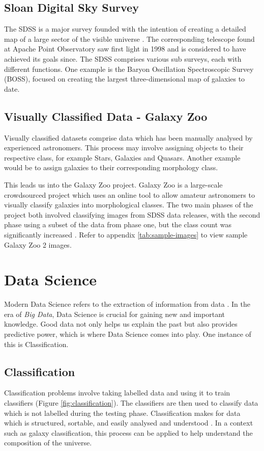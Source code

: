 \subsection{Sloan Digital Sky Survey}
The SDSS is a major survey founded with the intention of creating a detailed map of a large sector of the visible universe \citep{blanton_sloan_2017}.
The corresponding telescope found at Apache Point Observatory saw first light in 1998 and is considered to have achieved its goals since.
The SDSS comprises various sub surveys, each with different functions.
One example is the Baryon Oscillation Spectroscopic Survey (BOSS), focused on creating the largest three-dimensional map of galaxies to date.

\subsection{Visually Classified Data - Galaxy Zoo}
Visually classified datasets comprise data which has been manually analysed by experienced astronomers.
This process may involve assigning objects to their respective class, for example Stars, Galaxies and Quasars.
Another example would be to assign galaxies to their corresponding morphology class.

This leads us into the Galaxy Zoo project.
Galaxy Zoo is a large-scale crowdsourced project which uses an online tool to allow amateur astronomers to visually classify galaxies into morphological classes.
The two main phases of the project both involved classifying images from SDSS data releases,
with the second phase using a subset of the data from phase one, but the class count was significantly increased \citep{willett_galaxy_2013}\citep{lintott_galaxy_2008}.
Refer to appendix \ref{tab:sample-images} to view sample Galaxy Zoo 2 images.

\section{Data Science}

Modern Data Science refers to the extraction of information from data \citep{dhar_data_nodate}.
In the era of \textit{Big Data}, Data Science is crucial for gaining new and important knowledge.
Good data not only helps us explain the past but also provides predictive power, which is where Data Science comes into play.
One instance of this is Classification.

\subsection{Classification}
Classification problems involve taking labelled data and using it to train classifiers (Figure \ref{fig:classification}).
The classifiers are then used to classify data which is not labelled during the testing phase.
Classification makes for data which is structured, sortable, and easily analysed and understood \cite{suthaharan_machine_2015}.
In a context such as galaxy classification, this process can be applied to help understand the composition of the universe.

